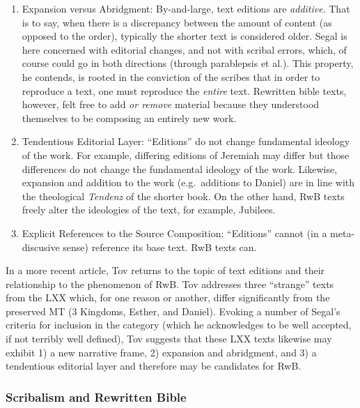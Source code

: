\begin{enumerate}
\def\labelenumi{\arabic{enumi}.}
\setcounter{enumi}{3}
\item
  Expansion versus Abridgment: By-and-large, text editions are
  \emph{additive}. That is to say, when there is a discrepancy between
  the amount of content (as opposed to the order), typically the shorter
  text is considered older. Segal is here concerned with editorial
  changes, and not with scribal errors, which, of course could go in
  both directions (through parablepsis et al.). This property, he
  contends, is rooted in the conviction of the scribes that in order to
  reproduce a text, one must reproduce the \emph{entire}
  text.\autocite[24]{segal_henze2005} Rewritten bible texts, however,
  felt free to add \emph{or remove} material because they understood
  themselves to be composing an entirely new
  work.\autocite[24]{segal_henze2005}
\item
  Tendentious Editorial Layer: ``Editions'' do not change fundamental
  ideology of the work. For example, differing editions of Jeremiah may
  differ but those differences do not change the fundamental ideology of
  the work. Likewise, expansion and addition to the work (e.g.~additions
  to Daniel) are in line with the theological \emph{Tendenz} of the
  shorter book. On the other hand, RwB texts freely alter the ideologies
  of the text, for example, Jubilees.\autocite[25]{segal_henze2005}
\item
  Explicit References to the Source Composition: ``Editions'' cannot (in
  a meta-discusive sense) reference its base text. RwB texts can.
\end{enumerate}

In a more recent article, Tov returns to the topic of text editions and
their relationship to the phenomenon of
RwB\autocite{tov_krarrer-kraus2008}. Tov addresses three ``strange''
texts from the LXX which, for one reason or another, differ
significantly from the preserved MT (3 Kingdoms, Esther, and Daniel).
Evoking a number of Segal's criteria\autocite{segal_henze2005} for
inclusion in the category (which he acknowledges to be well accepted, if
not terribly well defined), Tov suggests that these LXX texts likewise
may exhibit 1) a new narrative frame, 2) expansion and abridgment, and
3) a tendentious editorial layer and therefore may be candidates for
RwB.

\subsubsection{Scribalism and Rewritten Bible}\label{scribalism-and-rwb}

